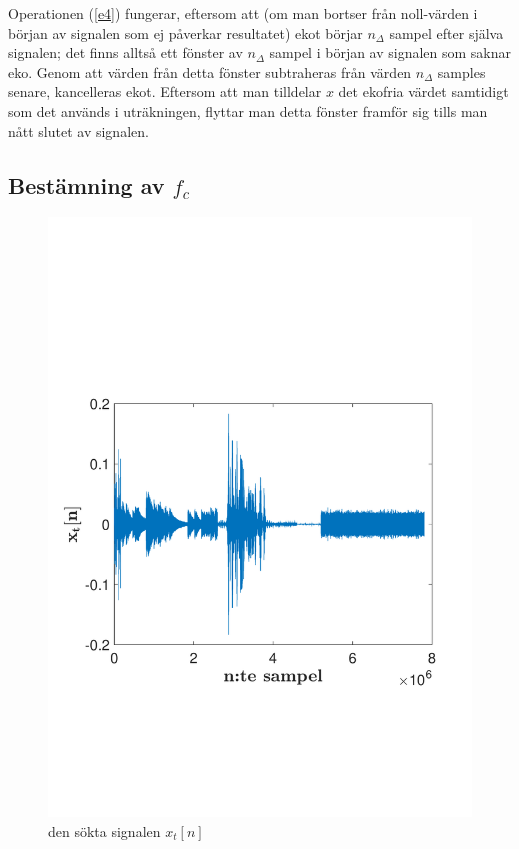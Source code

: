 \documentclass[10pt,twocolumn]{article}
\begin{document}
Operationen (\ref{e4}) fungerar, eftersom att (om man bortser från noll-värden i början av signalen som ej påverkar resultatet) ekot börjar $n_\Delta$
sampel efter själva signalen; det finns alltså ett fönster av $n_\Delta$ sampel i början av signalen som saknar eko. Genom att
värden från detta fönster subtraheras från värden $n_\Delta$ samples senare, kancelleras ekot. Eftersom att man tilldelar $x$ det ekofria
värdet samtidigt som det används i uträkningen, flyttar man detta fönster framför sig tills man nått slutet av signalen.

\subsection{Bestämning av $f_c$}

\begin{figure}[h]
    \includegraphics[trim = 0 50mm 0 80mm, clip, width=\linewidth]{fig2.pdf}
    \caption{
        den sökta signalen $x_t[n]$ 
        \label{fig:xt}
    }
\end{figure}
\end{document}
